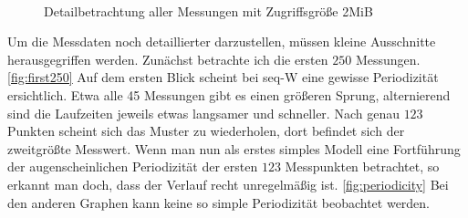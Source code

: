 \documentclass[
	12pt,
	a4paper,
	BCOR10mm,
	DIV14,
	listof=totoc,
	bibliography=totoc,
	headsepline
]{scrreprt}
\begin{document}
\begin{figure}
	\hfill
	\\
	\hfill
	\vspace*{-0.3cm}
	\caption{Detailbetrachtung aller Messungen mit Zugriffsgröße 2MiB}
	\label{fig:groesse2097152}
\end{figure}

Um die Messdaten noch detaillierter darzustellen, müssen kleine Ausschnitte herausgegriffen werden. Zunächst betrachte ich die ersten $250$ Messungen. \ref{fig:first250}
Auf dem ersten Blick scheint bei seq-W eine gewisse Periodizität ersichtlich. Etwa alle 45 Messungen gibt es einen größeren Sprung, alternierend sind die Laufzeiten jeweils etwas langsamer und schneller.
Nach genau $123$ Punkten scheint sich das Muster zu wiederholen, dort befindet sich der zweitgrößte Messwert. Wenn man nun als erstes simples Modell eine Fortführung der augenscheinlichen Periodizität der ersten $123$ Messpunkten betrachtet, so erkannt man doch, dass der Verlauf recht unregelmäßig ist. \ref{fig:periodicity}
Bei den anderen Graphen kann keine so simple Periodizität beobachtet werden.
\end{document}
